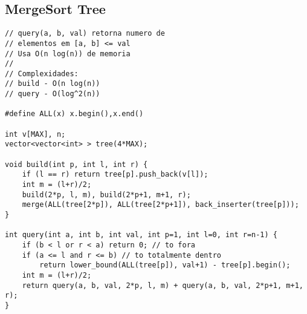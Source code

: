 \documentclass[12pt, a4paper, twoside]{article}
\begin{document}
\subsection{MergeSort Tree}
\begin{lstlisting}
// query(a, b, val) retorna numero de
// elementos em [a, b] <= val
// Usa O(n log(n)) de memoria
//
// Complexidades:
// build - O(n log(n))
// query - O(log^2(n))

#define ALL(x) x.begin(),x.end()

int v[MAX], n;
vector<vector<int> > tree(4*MAX);

void build(int p, int l, int r) {
	if (l == r) return tree[p].push_back(v[l]);
	int m = (l+r)/2;
	build(2*p, l, m), build(2*p+1, m+1, r);
	merge(ALL(tree[2*p]), ALL(tree[2*p+1]), back_inserter(tree[p]));
}

int query(int a, int b, int val, int p=1, int l=0, int r=n-1) {
	if (b < l or r < a) return 0; // to fora
	if (a <= l and r <= b) // to totalmente dentro
		return lower_bound(ALL(tree[p]), val+1) - tree[p].begin();
	int m = (l+r)/2;
	return query(a, b, val, 2*p, l, m) + query(a, b, val, 2*p+1, m+1, r);
}
\end{lstlisting}
\end{document}
